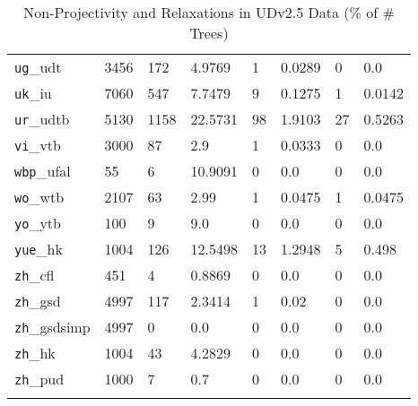 \begin{longtable}{|l|l|l|l|l|l|l|l|}
\texttt{ug}\_udt & 3456 & 172 & 4.9769 & 1 & 0.0289 & 0 & 0.0\\
\texttt{uk}\_iu & 7060 & 547 & 7.7479 & 9 & 0.1275 & 1 & 0.0142\\
\texttt{ur}\_udtb & 5130 & 1158 & 22.5731 & 98 & 1.9103 & 27 & 0.5263\\
\texttt{vi}\_vtb & 3000 & 87 & 2.9 & 1 & 0.0333 & 0 & 0.0\\
\texttt{wbp}\_ufal & 55 & 6 & 10.9091 & 0 & 0.0 & 0 & 0.0\\
\texttt{wo}\_wtb & 2107 & 63 & 2.99 & 1 & 0.0475 & 1 & 0.0475\\
\texttt{yo}\_ytb & 100 & 9 & 9.0 & 0 & 0.0 & 0 & 0.0\\
\texttt{yue}\_hk & 1004 & 126 & 12.5498 & 13 & 1.2948 & 5 & 0.498\\
\texttt{zh}\_cfl & 451 & 4 & 0.8869 & 0 & 0.0 & 0 & 0.0\\
\texttt{zh}\_gsd & 4997 & 117 & 2.3414 & 1 & 0.02 & 0 & 0.0\\
\texttt{zh}\_gsdsimp & 4997 & 0 & 0.0 & 0 & 0.0 & 0 & 0.0\\
\texttt{zh}\_hk & 1004 & 43 & 4.2829 & 0 & 0.0 & 0 & 0.0\\
\texttt{zh}\_pud & 1000 & 7 & 0.7 & 0 & 0.0 & 0 & 0.0\\
\hline
\caption{Non-Projectivity and Relaxations in UDv2.5 Data (\% of \# Trees)}
\end{longtable}